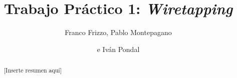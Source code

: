 \documentclass[%
    final,
    notitlepage,
    narroweqnarray,
    inline,
    twoside,
]{ieee}
\begin{document}
\title[Trabajo Práctico 1: Wiretapping]{%
       Trabajo Práctico 1: \emph{Wiretapping}}

\author[FRIZZO, MONTEPAGANO, PONDAL]{Franco Frizzo, Pablo Montepagano
\and{}e Iván Pondal}


\maketitle

\begin{abstract}
[Inserte resumen aquí]
\end{abstract}

\begin{keywords}
\end{keywords}







\end{document}
